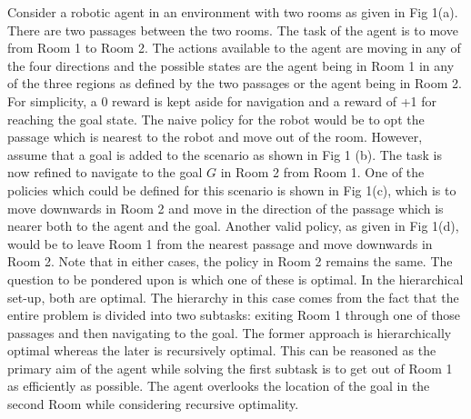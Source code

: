 Consider a robotic agent in an environment with two rooms as given in Fig 1(a).
There are two passages between the two rooms. The task of the agent is to move from Room 1 to Room 2.
The actions available to the agent are moving in any of the four directions and the possible states
are the agent being in Room 1 in any of the three regions as defined by the two passages or the agent being in Room
2.  For simplicity, a 0 reward is kept aside for navigation and a reward of +1 for reaching the goal state.
The naive policy for the robot would be to opt the passage which is nearest to the robot and move out of the room.
However, assume that a goal is added to the scenario as shown in Fig 1 (b).
The task is now refined to navigate to the goal \(G\) in Room 2 from Room 1.
One of the policies which could be defined for this scenario is shown in Fig 1(c),
which is to move downwards in Room 2 and move in the direction of the passage which is nearer
both to the agent and the goal. Another valid policy, as given in Fig 1(d), would be to leave
Room 1 from the nearest passage and move downwards in Room 2. Note that in either cases,
the policy in Room 2 remains the same. The question to be pondered upon is which one of these is optimal.
In the hierarchical set-up, both are optimal. The hierarchy in this case comes from the fact that
the entire problem is divided into two subtasks: exiting Room 1 through one of those passages and then
navigating to the goal. The former approach is hierarchically optimal whereas the later is recursively optimal.
This can be reasoned as the primary aim of the agent while solving the first subtask is to get out of Room 1
as efficiently as possible.
The agent overlooks the location of the goal in the second Room while considering recursive optimality.

